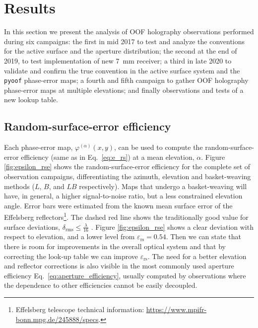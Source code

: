 \documentclass[
    ]
    {aa}
\begin{document}
    \section{Results}
    \label{sec:results}
    
    In this section we present the analysis of OOF holography observations performed during six campaigns: the first in mid 2017 to test and analyze the conventions for the active surface and the aperture distribution; the second at the end of 2019, to test implementation of new \SI{7}{\mm} receiver; a third in late 2020 to validate and confirm the true convention in the active surface system and the \texttt{pyoof} phase-error maps; a fourth and fifth campaign to gather OOF holography phase-error maps at multiple elevations; and finally observations and tests of a new lookup table.

    \subsection{Random-surface-error efficiency}
    \label{sec:random-surface-error_efficiency}
    Each phase-error map, $\varphi^{(\alpha)}(x, y)$, can be used to compute the random-surface-error efficiency (same as in Eq.~\ref{eq:e_rs}) at a mean elevation, $\alpha$. Figure \ref{fig:epsilon_rse} shows the random-surface-error efficiency for the complete set of observation campaigns, differentiating the azimuth, elevation and basket-weaving methods ($L$, $B$, and $LB$ respectively). Maps that undergo a basket-weaving will have, in general, a higher signal-to-noise ratio, but a less constrained elevation angle.
    Error bars were estimated from the known mean surface error of the Effelsberg reflectors\footnote{Effelsberg telescope technical information: \url{https://www.mpifr-bonn.mpg.de/245888/specs}.}. The dashed red line shows the traditionally good value for surface deviations, $\delta_\text{rms} \leq \frac{\lambda}{16}$ \citep[see][Chapter~7]{stutzman1998antenna}. Figure \ref{fig:epsilon_rse} shows a clear deviation with respect to elevation, and a lower level from $\varepsilon_\text{rs}=0.54$. Then we can state that there is room for improvements in the overall optical system and that by correcting the look-up table we can improve $\varepsilon_\text{rs}$. The need for a better elevation and reflector corrections is also visible in the most commonly used aperture efficiency Eq.~\eqref{eq:aperture_efficiency}, usually computed by observations where the dependence to other efficiencies cannot be easily decoupled.
\end{document}
